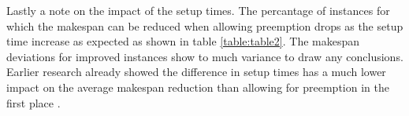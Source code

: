 Lastly a note on the impact of the setup times. The percantage of instances for which the makespan can be reduced when allowing preemption drops as the setup time increase as expected as shown in table \ref{table:table2}. The makespan deviations for improved instances show to much variance to draw any conclusions. Earlier research already showed the difference in setup times has a much lower impact on the average makespan reduction than allowing for preemption in the first place \cite{RN1}.
